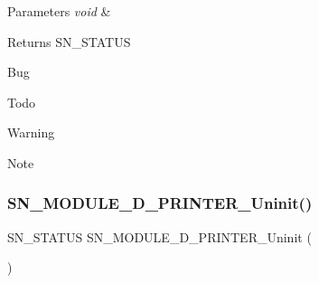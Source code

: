 \begin{DoxyParams}{Parameters}
{\em void} & \\
\hline
\end{DoxyParams}
\begin{DoxyReturn}{Returns}
S\+N\+\_\+\+S\+T\+A\+T\+US 
\end{DoxyReturn}
\begin{DoxyRefDesc}{Bug}
\item[\hyperlink{bug__bug000005}{Bug}]\end{DoxyRefDesc}
\begin{DoxyRefDesc}{Todo}
\item[\hyperlink{todo__todo000005}{Todo}]\end{DoxyRefDesc}
\begin{DoxyWarning}{Warning}

\end{DoxyWarning}
\begin{DoxyNote}{Note}

\end{DoxyNote}
\mbox{\label{group__Module_ga776f5e31b0c0e176e35669f9432baec0}} 
\subsubsection{\texorpdfstring{S\+N\+\_\+\+M\+O\+D\+U\+L\+E\+\_\+D\+\_\+\+P\+R\+I\+N\+T\+E\+R\+\_\+\+Uninit()}{SN\_MODULE\_3D\_PRINTER\_Uninit()}}
{\footnotesize\ttfamily S\+N\+\_\+\+S\+T\+A\+T\+US S\+N\+\_\+\+M\+O\+D\+U\+L\+E\+\_\+D\+\_\+\+P\+R\+I\+N\+T\+E\+R\+\_\+\+Uninit (\begin{DoxyParamCaption}\item[{void}]{ }\end{DoxyParamCaption})}


